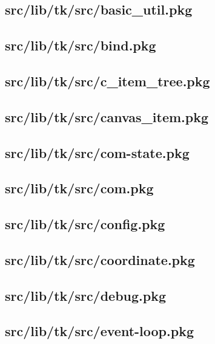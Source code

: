 \subsection{src/lib/tk/src/basic\_util.pkg}


\subsection{src/lib/tk/src/bind.pkg}


\subsection{src/lib/tk/src/c\_item\_tree.pkg}


\subsection{src/lib/tk/src/canvas\_item.pkg}


\subsection{src/lib/tk/src/com-state.pkg}


\subsection{src/lib/tk/src/com.pkg}


\subsection{src/lib/tk/src/config.pkg}


\subsection{src/lib/tk/src/coordinate.pkg}


\subsection{src/lib/tk/src/debug.pkg}


\subsection{src/lib/tk/src/event-loop.pkg}


